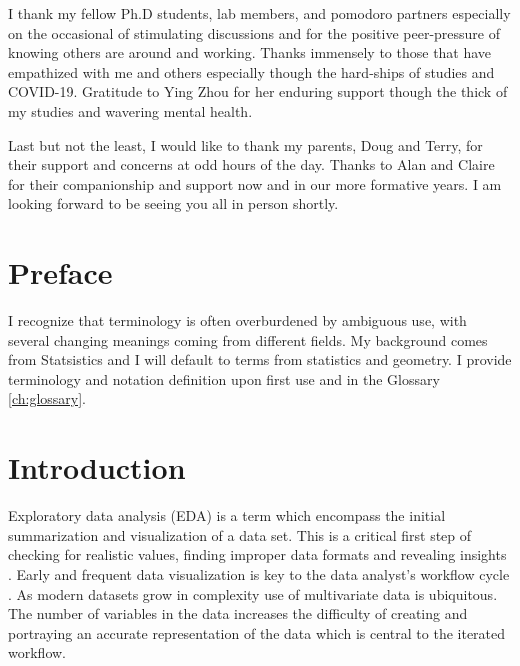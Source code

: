 \documentclass{template/monashthesis}
\begin{document}
I thank my fellow Ph.D students, lab members, and pomodoro partners especially on the occasional of stimulating discussions and for the positive peer-pressure of knowing others are around and working. Thanks immensely to those that have empathized with me and others especially though the hard-ships of studies and COVID-19. Gratitude to Ying Zhou for her enduring support though the thick of my studies and wavering mental health.

Last but not the least, I would like to thank my parents, Doug and Terry, for their support and concerns at odd hours of the day. Thanks to Alan and Claire for their companionship and support now and in our more formative years. I am looking forward to be seeing you all in person shortly.

\hypertarget{preface}{%
\chapter*{Preface}\label{preface}}

I recognize that terminology is often overburdened by ambiguous use, with several changing meanings coming from different fields. My background comes from Statsistics and I will default to terms from statistics and geometry. I provide terminology and notation definition upon first use and in the Glossary \ref{ch:glossary}.

\hypertarget{ch:introduction}{%
\chapter{Introduction}\label{ch:introduction}}

Exploratory data analysis (EDA) is a term which encompass the initial summarization and visualization of a data set. This is a critical first step of checking for realistic values, finding improper data formats and revealing insights \autocite{tukey_exploratory_1977}. Early and frequent data visualization is key to the data analyst's workflow cycle \autocite{wickham_r_2017}. As modern datasets grow in complexity use of multivariate data is ubiquitous. The number of variables in the data increases the difficulty of creating and portraying an accurate representation of the data which is central to the iterated workflow.
\end{document}
